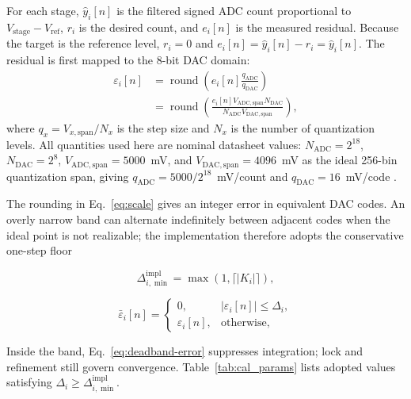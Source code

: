 For each stage, $\hat{y}_i[n]$ is the filtered signed ADC count proportional to $V_{\mathrm{stage}}-V_{\mathrm{ref}}$, $r_i$ is the desired count, and $e_i[n]$ is the measured residual. Because the target is the reference level, $r_i=0$ and
$e_i[n]=\hat{y}_i[n]-r_i=\hat{y}_i[n]$. The residual is first mapped to the 8-bit DAC domain:
\begin{equation}
 \begin{aligned}
 \varepsilon_i[n]
 &= \operatorname{round}\!\left(e_i[n]\frac{q_{\mathrm{ADC}}}{q_{\mathrm{DAC}}}\right)\\
 &= \operatorname{round}\!\left(
 \frac{e_i[n]V_{\mathrm{ADC,span}}N_{\mathrm{DAC}}}
 {N_{\mathrm{ADC}}V_{\mathrm{DAC,span}}}\right),
 \end{aligned}
 \label{eq:scale}
\end{equation}
where $q_x=V_{x,\mathrm{span}}/N_x$ is the step size and $N_x$ is the number of quantization levels. All quantities used here are nominal datasheet values: $N_{\mathrm{ADC}}=2^{18}$, $N_{\mathrm{DAC}}=2^8$, $V_{\mathrm{ADC,span}}=5000$~mV, and $V_{\mathrm{DAC,span}}=4096$~mV as the ideal 256-bin quantization span, giving $q_{\mathrm{ADC}}=5000/2^{18}$~mV/count and $q_{\mathrm{DAC}}=16$~mV/code \cite{InfineonPSoC,InfineonAN60305}.

The rounding in Eq.~\ref{eq:scale} gives an integer error in equivalent DAC codes. An overly narrow band can alternate indefinitely between adjacent codes when the ideal point is not realizable; the implementation therefore adopts the conservative one-step floor
\par\noindent
\begin{minipage}[c]{0.45\columnwidth}
\footnotesize
\begin{equation}
 \Delta_{i,\min}^{\mathrm{impl}}=\max(1,\lceil|K_i|\rceil),
 \label{eq:deadband}
\end{equation}
\end{minipage}%
\hfill
\begin{minipage}[c]{0.54\columnwidth}
\footnotesize
\begin{equation}
 \bar{\varepsilon}_i[n]=
 \begin{cases}
 0, & |\varepsilon_i[n]|\leq\Delta_i,\\
 \varepsilon_i[n], & \text{otherwise},
 \end{cases}
 \label{eq:deadband-error}
\end{equation}
\end{minipage}
\par
Inside the band, Eq.~\ref{eq:deadband-error} suppresses integration; lock and refinement still govern convergence. Table~\ref{tab:cal_params} lists adopted values satisfying $\Delta_i\geq\Delta_{i,\min}^{\mathrm{impl}}$.

